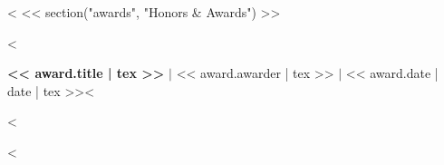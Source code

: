 <%
<< section("awards", "Honors & Awards") >>
\begin{description}
<%
  \item \textbf{<< award.title | tex >>} $|$ << award.awarder | tex >> $|$ << award.date | date | tex >><%

<%
\end{description}

<%
